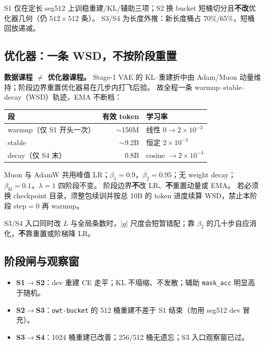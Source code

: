 \documentclass[UTF8,a4paper,11pt]{ctexart}
\begin{document}
S1 仅在定长 seg512 上训稳重建/KL/辅助三项；S2 换 bucket 短桶切分且\textbf{不改}优化器几何（仍 $512{\times}512$ 条）。
S3/S4 为长度外推：新长度桶占 70\%/65\%，短桶回放递减。

\subsection{优化器：一条 WSD，不按阶段重置}

\textbf{数据课程 $\neq$ 优化器课程。}
Stage-1 VAE 的 KL--重建折中由 Adam/Muon 动量维持；阶段边界重置优化器易在几步内打飞后验。
故全程一条 warmup--stable--decay（WSD）轨迹，EMA 不断档：

\begin{center}
\begin{tabular}{lrl}
\toprule
段 & 有效 token & 学习率 \\
\midrule
warmup（仅 S1 开头一次） & $\sim$150M & 线性 $0 \to 2{\times}10^{-3}$ \\
stable & $\sim$9.2B & 恒定 $2{\times}10^{-3}$ \\
decay（仅 S4 末） & 0.8B & cosine $\to 2{\times}10^{-4}$ \\
\bottomrule
\end{tabular}
\end{center}

Muon 与 AdamW 共用峰值 LR；$\beta_1{=}0.9$，$\beta_2{=}0.95$；无 weight decay；$\beta_{\mathrm{kl}}{=}0.1$，$\lambda{=}1$ 四阶段不变。
阶段边界\textbf{不}改 LR、\textbf{不}重置动量或 EMA。
若必须换 checkpoint 目录，须整包续训并按总 10B 的 token 进度续算 WSD，禁止本阶段 step$=0$ 再 warmup。

S3/S4 入口同时改 $L$ 与全局条数时，$|g|$ 尺度会短暂错配；靠 $\beta_2$ 的几十步自应消化，\textbf{不}靠重置或阶梯降 LR。

\subsection{阶段闸与观察窗}

\begin{itemize}
  \item \textbf{S1$\to$S2}：dev 重建 CE 走平；KL 不塌缩、不发散；辅助 \texttt{mask\_acc} 明显高于随机。
  \item \textbf{S2$\to$S3}：\texttt{owt-bucket} 的 512 桶重建不差于 S1 结束（勿用 seg512 dev 冒充）。
  \item \textbf{S3$\to$S4}：1024 桶重建已改善；256/512 桶无遗忘；S3 入口观察窗已过。
\end{itemize}
\end{document}
